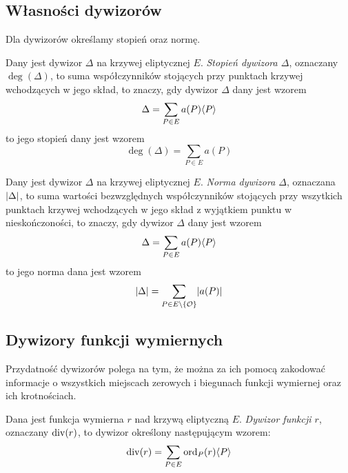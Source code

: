 \subsection*{Własności dywizorów}

Dla dywizorów określamy stopień oraz normę.

\begin{definition}
Dany jest dywizor $\Delta$ na krzywej eliptycznej $E$.
\emph{Stopień dywizora $\Delta$},
oznaczany $\deg(\Delta)$,
to suma współczynników
stojących przy punktach krzywej wchodzących w jego skład,
to znaczy, gdy dywizor $\Delta$ dany jest wzorem
\begin{equation*}
\Delta = \sum_{P \in E} a(P)\langle P\rangle
\end{equation*}
to jego stopień dany jest wzorem
\begin{equation*}
\deg(\Delta) = \sum_{P \in E} a(P)
\end{equation*}
\end{definition}

\begin{definition}
Dany jest dywizor $\Delta$ na krzywej eliptycznej $E$.
\emph{Norma dywizora $\Delta$},
oznaczana $\lvert\Delta\rvert$,
to suma wartości bezwzględnych współczynników
stojących przy wszytkich punktach krzywej wchodzących w jego skład
z wyjątkiem punktu w nieskończoności,
to znaczy, gdy dywizor $\Delta$ dany jest wzorem
\begin{equation*}
\Delta = \sum_{P \in E} a(P)\langle P\rangle
\end{equation*}
to jego norma dana jest wzorem
\begin{equation*}
\lvert\Delta\rvert = \sum_{P \in E \setminus \{\mathcal{O}\}} \lvert a(P)\rvert
\end{equation*}
\end{definition}

\subsection*{Dywizory funkcji wymiernych}

Przydatność dywizorów polega na tym, że można za ich pomocą
zakodować informacje
o wszystkich miejscach zerowych i biegunach funkcji wymiernej
oraz ich krotnościach.

\begin{definition}
Dana jest funkcja wymierna $r$ nad krzywą eliptyczną $E$.
\emph{Dywizor funkcji $r$},
oznaczany $\operatorname{div}(r)$,
to dywizor określony następującym wzorem:
\begin{equation*}
\operatorname{div}(r) = \sum_{P \in E} \operatorname{ord}_P(r)\langle P\rangle
\end{equation*}
\end{definition}

